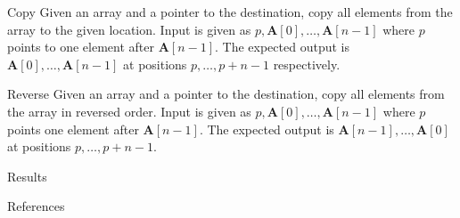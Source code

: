 \documentclass[xcolor={usenames}]{beamer}
\begin{document}
  \begin{frame}{Copy}
  	Given an array and a pointer to the destination, copy all elements from the array to the given location. Input is given as $p, \textbf{A}[0], \dots, \textbf{A}[n-1]$ where $p$ points to one element after $\textbf{A}[n-1]$. The expected output is $\textbf{A}[0], \dots, \textbf{A}[n-1]$ at positions $p, \dots, p+n-1$ respectively.			
  	\begin{table}[h!]
		\centering
\end{table}
  \end{frame}
  \begin{frame}{Reverse}
  	Given an array and a pointer to the destination, copy all elements from the array in reversed order. Input is given as $p, \textbf{A}[0], \dots, \textbf{A}[n-1]$ where $p$ points one element after $\textbf{A}[n-1]$. The expected output is $\textbf{A}[n-1], \dots, \textbf{A}[0]$ at positions $p, \dots, p+n-1$.
  	\begin{table}[h!]
		\centering
	\end{table}
  \end{frame}
  \begin{frame}{Results}
  
  \end{frame}
  \begin{frame}{References}
        
\end{frame}
\end{document}
